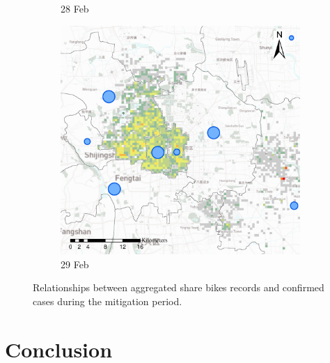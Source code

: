 \documentclass[preprints,ijgi,submit,moreauthors]{Definitions/mdpi}
\begin{document}
\begin{figure}[ht]
\begin{subfigure}{.3\textwidth}
        \caption{28 Feb}\label{fig:correlation_02_28}
    \end{subfigure}
    \begin{subfigure}{.3\textwidth}
        \includegraphics[width=\textwidth]{Figures/Relation_with_confrimed_cases/NewDistrictSSBD2020_02_29.eps}
        \caption{29 Feb}\label{fig:correlation_02_29}
    \end{subfigure}
    \caption{Relationships between aggregated share bikes records and confirmed cases during the mitigation period.}
    \label{fig:BSS_phase_3}
\end{figure}


\section{Conclusion}
\end{document}
